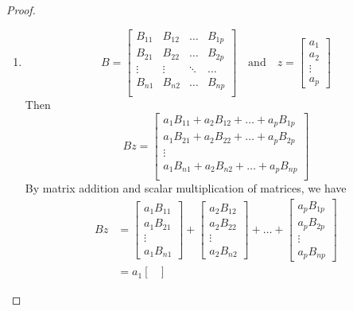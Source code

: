 \documentclass[12pt, a4paper]{article}
\theoremstyle{definition}
\theoremstyle{remark}
\begin{document}
\begin{proof}
    \begin{enumerate}
        \item \[
        B=\begin{bmatrix}
            B_{11} & B_{12} & \ldots & B_{1p} \\
            B_{21} & B_{22} & \ldots & B_{2p} \\
            \vdots & \vdots & \ddots & \ldots \\
            B_{n1} & B_{n2} & \ldots & B_{np} \\
        \end{bmatrix} \quad \text{and} \quad z = \begin{bmatrix}
            a_1 \\ a_2 \\ \vdots \\ a_p
        \end{bmatrix}
        \]
        Then
        \[
        Bz = \begin{bmatrix}
            a_1B_{11}+a_2B_{12}+\ldots+a_pB_{1p}\\
            a_1B_{21}+a_2B_{22}+\ldots+a_pB_{2p}\\
            \vdots \\
            a_1B_{n1}+a_2B_{n2}+\ldots+a_pB_{np}\\
        \end{bmatrix}
        \]
        By matrix addition and scalar multiplication of matrices, we have
        \begin{align*}
            Bz &= \begin{bmatrix}
                a_1B_{11} \\ a_1B_{21} \\ \vdots \\ a_1B_{n1}
            \end{bmatrix} + \begin{bmatrix}
                a_2B_{12} \\ a_2B_{22} \\ \vdots \\ a_2B_{n2}
            \end{bmatrix} + \ldots + \begin{bmatrix}
                a_pB_{1p} \\ a_pB_{2p} \\ \vdots \\ a_pB_{np}
            \end{bmatrix} \\
            &= a_1\begin{bmatrix}

\end{bmatrix}
\end{align*}
\end{enumerate}
\end{proof}
\end{document}

